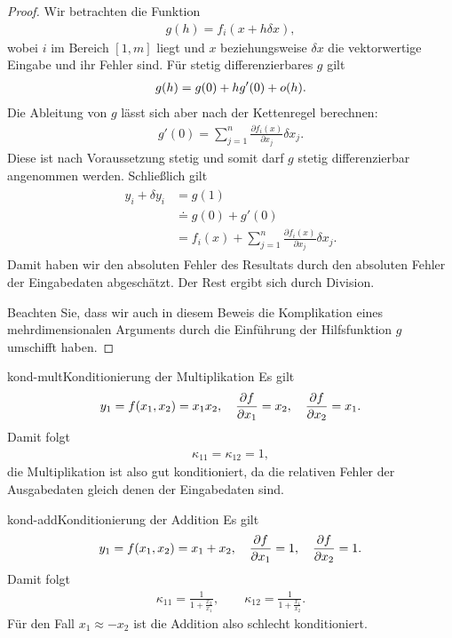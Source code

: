 \begin{proof}
  Wir betrachten die Funktion
  \begin{gather}
    g(h) = f_i(x + h \delta x),
  \end{gather}
  wobei $i$ im Bereich $[1,m]$ liegt und $x$ beziehungsweise
  $\delta x$ die vektorwertige Eingabe und ihr Fehler sind. Für stetig
  differenzierbares $g$ gilt
  \begin{gather}
    g(h) = g(0) + h g'(0) + o(h).
  \end{gather}
  Die Ableitung von $g$ lässt sich aber nach der Kettenregel berechnen:
  \begin{gather}
    g'(0) = \sum_{j=1}^n \frac{\partial f_i(x)}{\partial x_j} \delta x_j.
  \end{gather}
  Diese ist nach Voraussetzung stetig und somit darf $g$ stetig
  differenzierbar angenommen werden.
  Schließlich gilt
  \begin{gather}
    \begin{split}
      y_i+\delta y_i &= g(1) \\
      &\doteq g(0) + g'(0)\\
      &= f_i(x) + \sum_{j=1}^n \frac{\partial f_i(x)}{\partial x_j} \delta x_j.
    \end{split}
  \end{gather}
  Damit haben wir den absoluten Fehler des Resultats durch den
  absoluten Fehler der Eingabedaten abgeschätzt. Der Rest ergibt sich
  durch Division.
  
  Beachten Sie, dass wir auch in diesem Beweis die Komplikation eines
  mehrdimensionalen Arguments durch die Einführung der Hilfsfunktion
  $g$ umschifft haben.
\end{proof}

\begin{Beispiel*}{kond-mult}{Konditionierung der Multiplikation}
  Es gilt
  \begin{gather}
    y_1 = f(x_1,x_2) = x_1 x_2,
    \quad \frac{\partial f}{\partial x_1} = x_2,
    \quad \frac{\partial f}{\partial x_2} = x_1.
  \end{gather}
  Damit folgt
  \begin{gather}
    \kappa_{11} = \kappa_{12} = 1,
  \end{gather}
  die Multiplikation ist also gut konditioniert, da die relativen
  Fehler der Ausgabedaten gleich denen der Eingabedaten sind.
\end{Beispiel*}

\begin{Beispiel*}{kond-add}{Konditionierung der Addition}
  Es gilt
  \begin{gather}
    y_1 = f(x_1,x_2) = x_1 + x_2,
    \quad \frac{\partial f}{\partial x_1} = 1,
    \quad \frac{\partial f}{\partial x_2} = 1.
  \end{gather}
  Damit folgt
  \begin{gather}
    \kappa_{11} = \frac{1}{1+\frac{x_2}{x_1}},
    \qquad\kappa_{12} = \frac{1}{1+\frac{x_1}{x_2}}.
  \end{gather}
  Für den Fall $x_1 \approx -x_2$ ist die Addition also schlecht konditioniert.
\end{Beispiel*}

